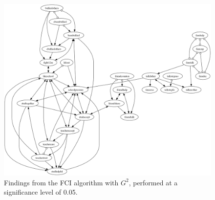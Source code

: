 \begin{figure}[htbp]
    \centering
    \includegraphics[width=1\textwidth]{Report/final_report/pictures/FCI_gsq_0.05_all_UA_27_talkmother.png}
    \caption{Findings from the FCI algorithm with $G^2$, performed at a significance level of 0.05.}
    \label{fig:fci_gsq_0.05all_UA_27_talkmother}
\end{figure}

